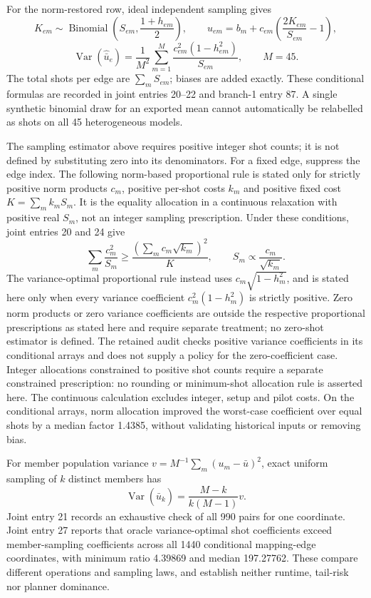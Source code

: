 \documentclass{article}
\begin{document}
For the norm-restored row, ideal independent sampling gives
\[
K_{em}\sim\operatorname{Binomial}\left(S_{em},\frac{1+h_{em}}{2}\right),
\qquad
\widehat u_{em}=b_m+c_{em}\left(\frac{2K_{em}}{S_{em}}-1\right),
\]
\[
\operatorname{Var}(\widehat{\bar u}_e)
=\frac{1}{M^2}\sum_{m=1}^{M}
\frac{c_{em}^2(1-h_{em}^2)}{S_{em}},\qquad M=45.
\]
The total shots per edge are \(\sum_mS_{em}\); biases are added exactly. These conditional formulas are recorded in joint entries 20--22 and branch-1 entry 87. A single synthetic binomial draw for an exported mean cannot automatically be relabelled as shots on all 45 heterogeneous models.

The sampling estimator above requires positive integer shot counts; it is not defined by substituting zero into its denominators. For a fixed edge, suppress the edge index. The following norm-based proportional rule is stated only for strictly positive norm products \(c_m\), positive per-shot costs \(k_m\) and positive fixed cost \(K=\sum_m k_mS_m\). It is the equality allocation in a continuous relaxation with positive real \(S_m\), not an integer sampling prescription. Under these conditions, joint entries 20 and 24 give
\[
\sum_m\frac{c_m^2}{S_m}\geq
\frac{\left(\sum_m c_m\sqrt{k_m}\right)^2}{K},
\qquad S_m\propto\frac{c_m}{\sqrt{k_m}}.
\]
The variance-optimal proportional rule instead uses \(c_m\sqrt{1-h_m^2}\), and is stated here only when every variance coefficient \(c_m^2(1-h_m^2)\) is strictly positive. Zero norm products or zero variance coefficients are outside the respective proportional prescriptions as stated here and require separate treatment; no zero-shot estimator is defined. The retained audit checks positive variance coefficients in its conditional arrays and does not supply a policy for the zero-coefficient case. Integer allocations constrained to positive shot counts require a separate constrained prescription: no rounding or minimum-shot allocation rule is asserted here. The continuous calculation excludes integer, setup and pilot costs. On the conditional arrays, norm allocation improved the worst-case coefficient over equal shots by a median factor 1.4385, without validating historical inputs or removing bias.

For member population variance \(v=M^{-1}\sum_m(u_m-\bar u)^2\), exact uniform sampling of \(k\) distinct members has
\[
\operatorname{Var}(\widehat{\bar u}_k)=\frac{M-k}{k(M-1)}v.
\]
Joint entry 21 records an exhaustive check of all 990 pairs for one coordinate. Joint entry 27 reports that oracle variance-optimal shot coefficients exceed member-sampling coefficients across all 1440 conditional mapping-edge coordinates, with minimum ratio 4.39869 and median 197.27762. These compare different operations and sampling laws, and establish neither runtime, tail-risk nor planner dominance.
\end{document}
